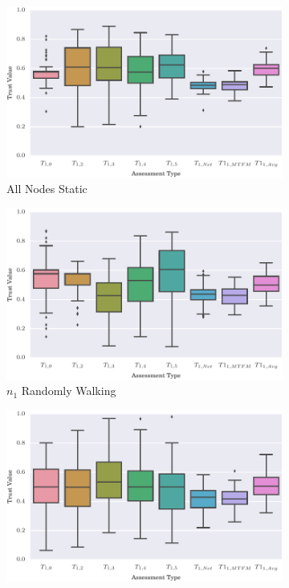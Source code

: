 \documentclass[runningheads,a4paper]{llncs}
\begin{document}
{{\begin{figure}
\begin{subfigure}{.5\textwidth}
  \centering
  \includegraphics[width=.8\linewidth]{img/trust_bella_static.pdf}
  \caption{All Nodes Static}
  \label{fig:trust_static}
\end{subfigure}%
\begin{subfigure}{.5\textwidth}
  \centering
  \includegraphics[width=.8\linewidth]{img/trust_bella_single_mobile.pdf}
  \caption{$n_1$ Randomly Walking}
  \label{fig:trust_single}
\end{subfigure}
\begin{subfigure}{.5\textwidth}
\centering
  \includegraphics[width=.8\linewidth]{img/trust_bella_allbut1_mobile.pdf}

\end{subfigure}
\end{figure}}}
\end{document}
